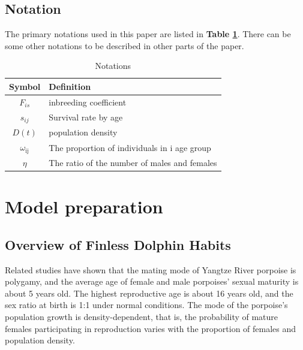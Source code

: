 \documentclass[12pt]{article}  %
\begin{document}
\subsection{Notation}
The primary notations used in this paper are listed in \textbf{Table \ref{Ntt}}. There can be some
other notations to be described in other parts of the paper.
\begin{table}[!htbp]
\begin{center}
\caption{Notations}
\begin{tabular}{cl}
    \toprule
    \multicolumn{1}{m{3cm}}{\centering Symbol}
    &\multicolumn{1}{m{8cm}}{\centering Definition}\\
    \midrule
   ${{F}_{is}}$&inbreeding coefficient\\
    ${{s}_{ij}}$&Survival rate by age\\
   $D(t)$&population density\\
    ${{\omega }_{\text{ij}}}$&The proportion of individuals in i age group\\
    $\eta $&The ratio of the number of males and females\\
    \bottomrule
\end{tabular}\label{Ntt}
\end{center}
\end{table}


\section{Model preparation}

\subsection{Overview of Finless Dolphin Habits}
Related studies have shown that the mating mode of Yangtze River porpoise is polygamy, and the average age of female and male porpoises’ sexual maturity is about 5 years old. The highest reproductive age is about 16 years old, and the sex ratio at birth is 1:1 under normal conditions. The mode of the porpoise’s population growth is density-dependent, that is, the probability of mature females participating in reproduction varies with the proportion of females and population density.
\end{document}
